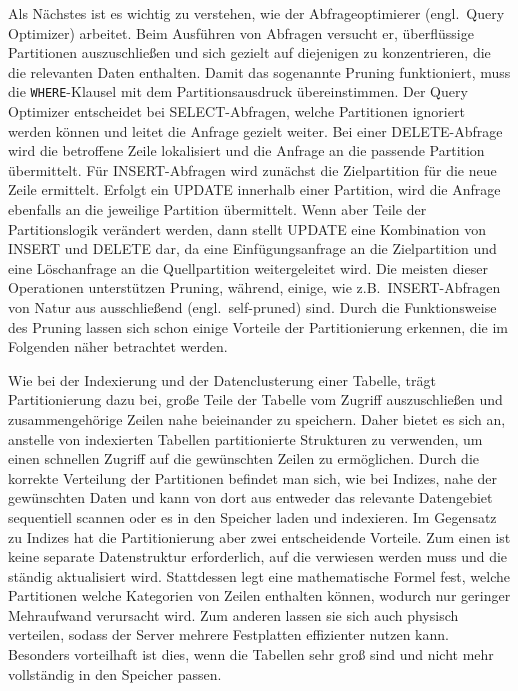 Als Nächstes ist es wichtig zu verstehen, wie der Abfrageoptimierer (engl.\ Query Optimizer) arbeitet.
Beim Ausführen von Abfragen versucht er, überflüssige Partitionen auszuschließen und sich gezielt auf diejenigen zu konzentrieren, die die relevanten Daten enthalten.
Damit das sogenannte Pruning funktioniert, muss die \texttt{WHERE}-Klausel mit dem Partitionsausdruck übereinstimmen.
Der Query Optimizer entscheidet bei SELECT-Abfragen, welche Partitionen ignoriert werden können und leitet die Anfrage gezielt weiter.
Bei einer DELETE-Abfrage wird die betroffene Zeile lokalisiert und die Anfrage an die passende Partition übermittelt.
Für INSERT-Abfragen wird zunächst die Zielpartition für die neue Zeile ermittelt.
Erfolgt ein UPDATE innerhalb einer Partition, wird die Anfrage ebenfalls an die jeweilige Partition übermittelt.
Wenn aber Teile der Partitionslogik verändert werden, dann stellt UPDATE eine Kombination von INSERT und DELETE dar, da eine Einfügungsanfrage an die Zielpartition und eine Löschanfrage an die Quellpartition weitergeleitet wird.
Die meisten dieser Operationen unterstützen Pruning, während, einige, wie z.B.\ INSERT-Abfragen von Natur aus ausschließend (engl.\ self-pruned) sind.
Durch die Funktionsweise des Pruning lassen sich schon einige Vorteile der Partitionierung erkennen, die im Folgenden näher betrachtet werden.

Wie bei der Indexierung und der Datenclusterung einer Tabelle, trägt Partitionierung dazu bei, große Teile der Tabelle vom Zugriff auszuschließen und zusammengehörige Zeilen nahe beieinander zu speichern.
Daher bietet es sich an, anstelle von indexierten Tabellen partitionierte Strukturen zu verwenden, um einen schnellen Zugriff auf die gewünschten Zeilen zu ermöglichen.
Durch die korrekte Verteilung der Partitionen befindet man sich, wie bei Indizes, nahe der gewünschten Daten und kann von dort aus entweder das relevante Datengebiet sequentiell scannen oder es in den Speicher laden und indexieren.
Im Gegensatz zu Indizes hat die Partitionierung aber zwei entscheidende Vorteile.
Zum einen ist keine separate Datenstruktur erforderlich, auf die verwiesen werden muss und die ständig aktualisiert wird.
Stattdessen legt eine mathematische Formel fest, welche Partitionen welche Kategorien von Zeilen enthalten können, wodurch nur geringer Mehraufwand verursacht wird.
Zum anderen lassen sie sich auch physisch verteilen, sodass der Server mehrere Festplatten effizienter nutzen kann.
Besonders vorteilhaft ist dies, wenn die Tabellen sehr groß sind und nicht mehr vollständig in den Speicher passen.

